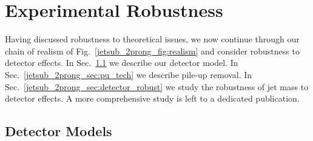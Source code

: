 \documentclass[11pt]{cernrep}
\begin{document}
\section{Experimental Robustness}\label{jetsub_2prong_sec:exp}

Having discussed robustness to theoretical issues, we now continue through our chain of realism of Fig.~\ref{jetsub_2prong_fig:realism} and consider robustness to detector effects.
%
In Sec.~\ref{jetsub_2prong_sec:det_model} we describe our detector model.
%
In Sec.~\ref{jetsub_2prong_sec:pu_tech} we describe pile-up removal.
%
In Sec.~\ref{jetsub_2prong_sec:detector_robust} we study the robustness of jet mass to detector effects.
%
A more comprehensive study is left to a dedicated publication.

\subsection{Detector Models}\label{jetsub_2prong_sec:det_model}
\end{document}
